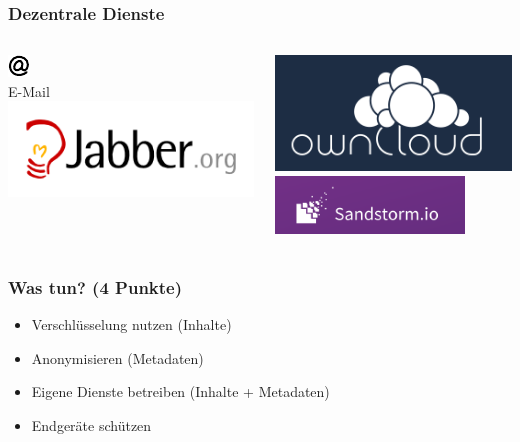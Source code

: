 \documentclass[12pt]{beamer}
\begin{document}
\begin{frame}
  \frametitle{Dezentrale Dienste}
    \begin{columns}
        \begin{column}{5cm}
            \begin{center}
                \includegraphics[height=0.2\textheight]{img/mail.pdf} \\
                E-Mail \\
                \vspace{1cm}
                \includegraphics[height=0.2\textheight]{img/jabber.png}
            \end{center}
        \end{column}
        \begin{column}{5cm}
            \begin{center}
                \includegraphics[height=0.2\textheight]{img/owncloud.png} \\
                \vspace{1cm}
                \includegraphics[width=0.8\textwidth]{img/sandstorm.png}
            \end{center}
        \end{column}
    \end{columns}
\end{frame}
 
\begin{frame}
  \frametitle{Was tun? (4 Punkte)}
  \begin{itemize}
    \item Verschlüsselung nutzen (Inhalte)
    \item Anonymisieren (Metadaten)
    \item Eigene Dienste betreiben (Inhalte + Metadaten)
    \item Endgeräte schützen
  \end{itemize}
\end{frame}
\end{document}
